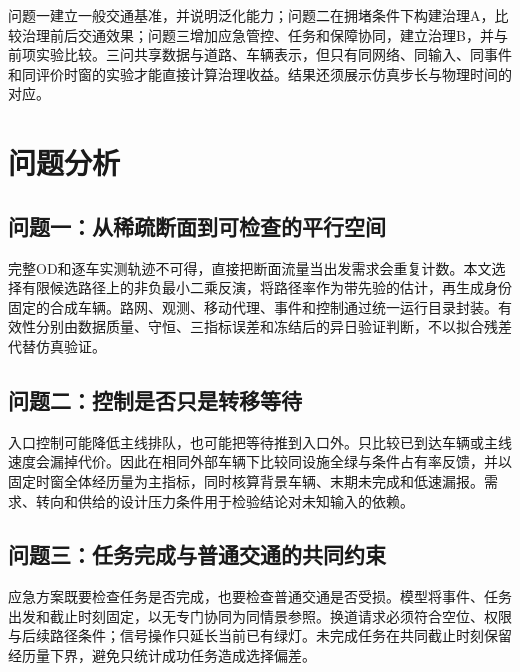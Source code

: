 \documentclass[UTF8,fontset=windows,zihao=-4,a4paper]{ctexart}
\begin{document}
问题一建立一般交通基准，并说明泛化能力；问题二在拥堵条件下构建治理A，比较治理前后交通效果；问题三增加应急管控、任务和保障协同，建立治理B，并与前项实验比较。三问共享数据与道路、车辆表示，但只有同网络、同输入、同事件和同评价时窗的实验才能直接计算治理收益。结果还须展示仿真步长与物理时间的对应。

\section{问题分析}
\subsection{问题一：从稀疏断面到可检查的平行空间}
完整OD和逐车实测轨迹不可得，直接把断面流量当出发需求会重复计数。本文选择有限候选路径上的非负最小二乘反演，将路径率作为带先验的估计，再生成身份固定的合成车辆。路网、观测、移动代理、事件和控制通过统一运行目录封装。有效性分别由数据质量、守恒、三指标误差和冻结后的异日验证判断，不以拟合残差代替仿真验证。

\subsection{问题二：控制是否只是转移等待}
入口控制可能降低主线排队，也可能把等待推到入口外。只比较已到达车辆或主线速度会漏掉代价。因此在相同外部车辆下比较同设施全绿与条件占有率反馈，并以固定时窗全体经历量为主指标，同时核算背景车辆、末期未完成和低速漏报。需求、转向和供给的设计压力条件用于检验结论对未知输入的依赖。

\subsection{问题三：任务完成与普通交通的共同约束}
应急方案既要检查任务是否完成，也要检查普通交通是否受损。模型将事件、任务出发和截止时刻固定，以无专门协同为同情景参照。换道请求必须符合空位、权限与后续路径条件；信号操作只延长当前已有绿灯。未完成任务在共同截止时刻保留经历量下界，避免只统计成功任务造成选择偏差。
\end{document}
